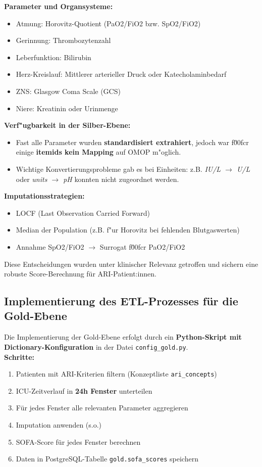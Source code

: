 \documentclass[12pt]{article}
\begin{document}
\noindent
\textbf{Parameter und Organsysteme:}
\begin{itemize}
\item Atmung: Horovitz-Quotient (PaO2/FiO2 bzw. SpO2/FiO2)
\item Gerinnung: Thrombozytenzahl
\item Leberfunktion: Bilirubin
\item Herz-Kreislauf: Mittlerer arterieller Druck oder Katecholaminbedarf
\item ZNS: Glasgow Coma Scale (GCS)
\item Niere: Kreatinin oder Urinmenge
\end{itemize}

\noindent
\textbf{Verf"ugbarkeit in der Silber-Ebene:}\\
\begin{itemize}
\item Fast alle Parameter wurden \textbf{standardisiert extrahiert}, jedoch war f\u00fcr einige \textbf{itemids kein Mapping} auf OMOP m"oglich.
\item Wichtige Konvertierungsprobleme gab es bei Einheiten: z.B. \textit{IU/L $\rightarrow$ U/L} oder \textit{units $\rightarrow$ pH} konnten nicht zugeordnet werden.
\end{itemize}

\noindent
\textbf{Imputationsstrategien:}
\begin{itemize}
\item LOCF (Last Observation Carried Forward)
\item Median der Population (z.B. f"ur Horovitz bei fehlenden Blutgaswerten)
\item Annahme SpO2/FiO2 $\rightarrow$ Surrogat f\u00fcr PaO2/FiO2
\end{itemize}

Diese Entscheidungen wurden unter klinischer Relevanz getroffen und sichern eine robuste Score-Berechnung für ARI-Patient:innen.

\subsection{Implementierung des ETL-Prozesses für die Gold-Ebene}

Die Implementierung der Gold-Ebene erfolgt durch ein \textbf{Python-Skript mit Dictionary-Konfiguration} in der Datei \texttt{config\_gold.py}.\\

\noindent
\textbf{Schritte:}
\begin{enumerate}
\item Patienten mit ARI-Kriterien filtern (Konzeptliste \texttt{ari\_concepts})
\item ICU-Zeitverlauf in \textbf{24h Fenster} unterteilen
\item Für jedes Fenster alle relevanten Parameter aggregieren
\item Imputation anwenden (s.o.)
\item SOFA-Score für jedes Fenster berechnen
\item Daten in PostgreSQL-Tabelle \texttt{gold.sofa\_scores} speichern
\end{enumerate}
\end{document}
